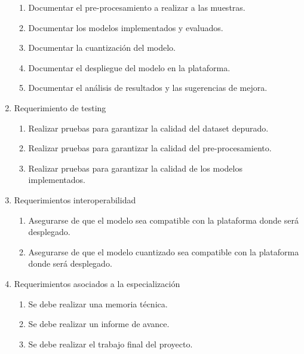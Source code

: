 \documentclass[
11pt, %
codirector, %
]{charter}
\begin{document}
\begin{enumerate}
\begin{enumerate}
			\item Documentar el pre-procesamiento a realizar a las muestras.
			\item Documentar los modelos implementados y evaluados.
			\item Documentar la cuantización del modelo.
			\item Documentar el despliegue del modelo en la plataforma.
			\item Documentar el análisis de resultados y las sugerencias de mejora.
		\end{enumerate}
	\item Requerimiento de testing
		\begin{enumerate}
			\item Realizar pruebas para garantizar la calidad del dataset depurado. 
			\item Realizar pruebas para garantizar la calidad del pre-procesamiento. 
			\item Realizar pruebas para garantizar la calidad de los modelos implementados.
		\end{enumerate}
	\item Requerimientos interoperabilidad
			\begin{enumerate}
			\item Asegurarse de que el modelo sea compatible con la plataforma donde será desplegado.
			\item Asegurarse de que el modelo cuantizado sea compatible con la plataforma donde será desplegado.
		\end{enumerate}
		\item Requerimientos asociados a la especialización
		\begin{enumerate}
			\item Se debe realizar una memoria técnica.
			\item Se debe realizar un informe de avance.
			\item Se debe realizar  el trabajo final del proyecto.
		\end{enumerate}
\end{enumerate}
\end{document}
